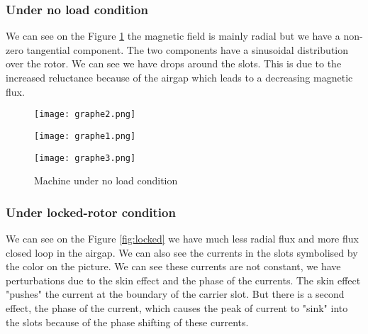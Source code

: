 \subsubsection{Under no load condition}
We can see on the Figure \ref{fig:no-load} the magnetic field is mainly radial but we have a non-zero tangential component. The two components have a sinusoidal distribution over the rotor. We can see we have drops around the slots. This is due to the increased reluctance because of the airgap which leads to a decreasing magnetic flux. 
\begin{figure}[H]
    \begin{minipage}{.3 \textwidth}
        \texttt{[image: graphe2.png]}
    \end{minipage}
    \begin{minipage}{.3 \textwidth}
        \texttt{[image: graphe1.png]}
        
    \end{minipage}
    \begin{minipage}{.3 \textwidth}
        \texttt{[image: graphe3.png]}
    \end{minipage}
    \caption{Machine under no load condition}
    \label{fig:no-load}
    
\end{figure}
\subsubsection{Under locked-rotor condition}
We can see on the Figure \ref{fig:locked} we have much less radial flux and more flux closed loop in the airgap. We can also see the currents in the slots symbolised by the color on the picture. We can see these currents are not constant, we have perturbations due to the skin effect and the phase of the currents. The skin effect "pushes" the current at the boundary of the carrier slot. But there is a second effect, the phase of the current, which causes the peak of current to "sink" into the slots because of the phase shifting of these currents.

